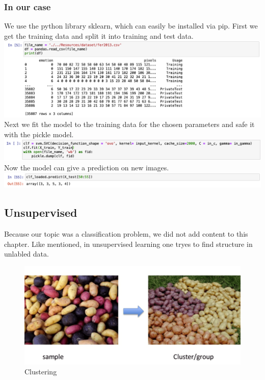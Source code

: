 \subsubsection{In our case}
We use the python library sklearn, which can easily be installed via pip.
First we get the training data and split it into training and test data.\\
\includegraphics[scale=0.4]{Images/trainingdata.png} \\
Next we fit the model to the training data for the chosen parameters and safe it with the pickle model. \\
\includegraphics[scale=0.4]{Images/trainmodel.png} \\
Now the model can give a prediction on new images. \\
\includegraphics[scale=0.4]{Images/svm_prediction.png}





\subsection{Unsupervised}

Because our topic was a classification problem, we did not add content to this chapter. Like mentioned, in unsupervised learning one tryes to find structure in unlabled data.

\begin{figure}[hbtp]
	\centering
	\includegraphics[scale=0.5]{cluster}
	\caption{Clustering}
	\label{fig:Datensatz - unbearbeitet}
\end{figure}


